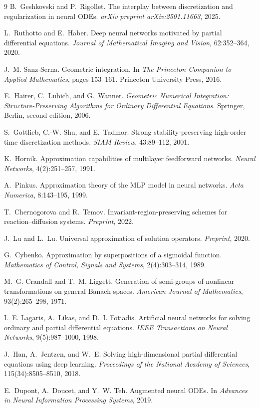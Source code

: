 \documentclass[hidelinks,review,nohypdvips,onefignum,onetabnum]{siamart220329}
\begin{document}
\begin{thebibliography}{9}
B.~Geshkovski and P.~Rigollet.
The interplay between discretization and regularization in neural ODEs.
\emph{arXiv preprint arXiv:2501.11663}, 2025.

L.~Ruthotto and E.~Haber.
Deep neural networks motivated by partial differential equations.
\emph{Journal of Mathematical Imaging and Vision}, 62:352--364, 2020.

J.~M. Sanz-Serna.
Geometric integration.
In \emph{The Princeton Companion to Applied Mathematics}, pages 153--161. Princeton University Press, 2016.

E.~Hairer, C.~Lubich, and G.~Wanner.
\emph{Geometric Numerical Integration: Structure-Preserving Algorithms for Ordinary Differential Equations}.
Springer, Berlin, second edition, 2006.

S.~Gottlieb, C.-W. Shu, and E.~Tadmor.
Strong stability-preserving high-order time discretization methods.
\emph{SIAM Review}, 43:89--112, 2001.

K.~Hornik.
Approximation capabilities of multilayer feedforward networks.
\emph{Neural Networks}, 4(2):251--257, 1991.

A.~Pinkus.
Approximation theory of the MLP model in neural networks.
\emph{Acta Numerica}, 8:143--195, 1999.

T.~Chernogorova and R.~Temov.
Invariant-region-preserving schemes for reaction--diffusion systems.
\emph{Preprint}, 2022.

J.~Lu and L.~Lu.
Universal approximation of solution operators.
\emph{Preprint}, 2020.

G.~Cybenko.
Approximation by superpositions of a sigmoidal function.
\emph{Mathematics of Control, Signals and Systems}, 2(4):303--314, 1989.

M.~G. Crandall and T.~M. Liggett.
Generation of semi-groups of nonlinear transformations on general Banach spaces.
\emph{American Journal of Mathematics}, 93(2):265--298, 1971.

I.~E. Lagaris, A.~Likas, and D.~I. Fotiadis.
Artificial neural networks for solving ordinary and partial differential equations.
\emph{IEEE Transactions on Neural Networks}, 9(5):987--1000, 1998.

J.~Han, A.~Jentzen, and W.~E.
Solving high-dimensional partial differential equations using deep learning.
\emph{Proceedings of the National Academy of Sciences}, 115(34):8505--8510, 2018.

E.~Dupont, A.~Doucet, and Y.~W. Teh.
Augmented neural ODEs.
In \emph{Advances in Neural Information Processing Systems}, 2019.

\end{thebibliography}
\end{document}
